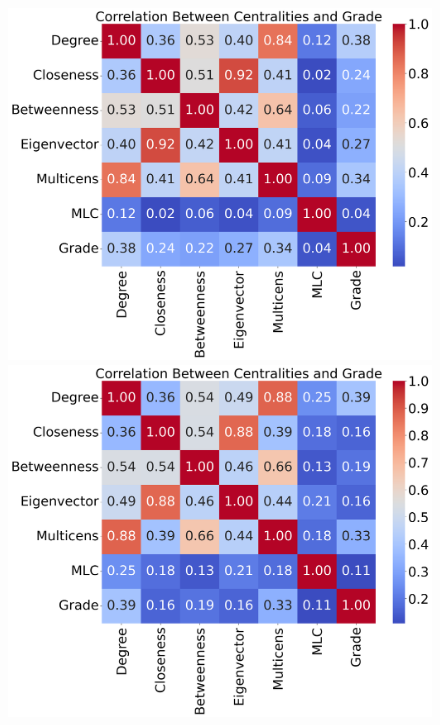 \documentclass[10pt,letterpaper]{article}
\begin{document}
\begin{figure}[h!]
\centering
\begin{minipage}[b]{0.28\linewidth}
\centering
\includegraphics[width=\textwidth]{figs/fig28-ahr_arnt-corr.png}
\subcaption{}
\end{minipage}
\hspace{0.5cm}
\begin{minipage}[b]{0.28\linewidth}
\centering
\includegraphics[width=\textwidth]{figs/fig29-clock_bmal1-corr.png}
\subcaption{}
\end{minipage}

\end{figure}
\end{document}

